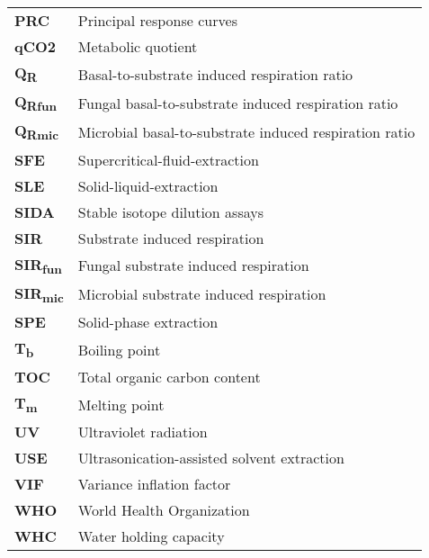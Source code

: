 \begin{normalsize}
\begin{longtable}{ll}
\textbf{PRC} & Principal response curves\\
\textbf{qCO2} & Metabolic quotient\\
\textbf{Q\textsubscript{R}} & Basal-to-substrate induced respiration ratio\\
\textbf{Q\textsubscript{Rfun}} & Fungal basal-to-substrate induced respiration ratio\\
\textbf{Q\textsubscript{Rmic}} & Microbial basal-to-substrate induced respiration ratio\\
\textbf{SFE} & Supercritical-fluid-extraction\\
\textbf{SLE} & Solid-liquid-extraction\\
\textbf{SIDA} & Stable isotope dilution assays\\
\textbf{SIR} & Substrate induced respiration\\
\textbf{SIR\textsubscript{fun}} & Fungal substrate induced respiration\\
\textbf{SIR\textsubscript{mic}} & Microbial substrate induced respiration\\
\textbf{SPE} & Solid-phase extraction\\
\textbf{T\textsubscript{b}} & Boiling point\\
\textbf{TOC} & Total organic carbon content\\
\textbf{T\textsubscript{m}} & Melting point\\
\textbf{UV} & Ultraviolet radiation\\
\textbf{USE} & Ultrasonication-assisted solvent extraction\\
\textbf{VIF} & Variance inflation factor\\
\textbf{WHO} & World Health Organization\\
\textbf{WHC} & Water holding capacity\\
\end{longtable}
\end{normalsize}

\clearpage